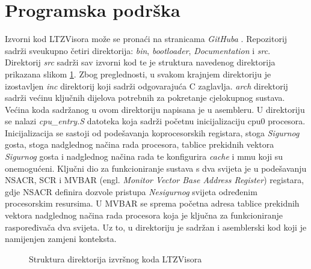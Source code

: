 \documentclass[times, utf8, diplomski, numeric]{fer}
\begin{document}
\section{Programska podrška}
Izvorni kod LTZVisora može se pronaći na stranicama \textit{GitHuba} \cite{ltzvisor_source}.
Repozitorij sadrži sveukupno četiri direktorija:
\textit{bin}, \textit{bootloader}, \textit{Documentation} i \textit{src}. Direktorij \textit{src} sadrži sav izvorni kod te
je struktura navedenog direktorija prikazana slikom \ref{srcdir}. Zbog preglednosti, u svakom krajnjem direktoriju je
izostavljen \textit{inc} direktorij koji sadrži odgovarajuća C zaglavlja.
\textit{arch} direktorij sadrži većinu ključnih dijelova potrebnih za pokretanje cjelokupnog sustava. Većina koda sadržanog u
ovom direktoriju napisana je u asembleru. U direktoriju se nalazi \textit{cpu\_entry.S} datoteka koja sadrži početnu
inicijalizaciju \gls{cpu}0 procesora. Inicijalizacija se sastoji od podešavanja koprocesorskih registara, stoga \textit{Sigurnog} gosta,
stoga nadglednog načina rada procesora, tablice prekidnih vektora \textit{Sigurnog} gosta i nadglednog načina rada te konfigurira
\textit{cache} i \gls{mmu} koji su onemogućeni. Ključni dio za funkcioniranje sustava s dva svijeta je u podešavanju NSACR, SCR
i MVBAR (engl. \textit{Monitor Vector Base Address Register}) registara, gdje NSACR definira dozvole pristupa \textit{Nesigurnog} svijeta
određenim procesorskim resursima. U MVBAR se sprema početna adresa tablice prekidnih vektora nadglednog načina rada procesora
koja je ključna za funkcioniranje raspoređivača dva svijeta. Uz to, u direktoriju je sadržan i asemblerski kod koji je
namijenjen zamjeni konteksta.

\begin{figure}[H]
  \centering
  \caption{Struktura direktorija izvršnog koda LTZVisora}
  \label{srcdir}
\end{figure}
\end{document}
